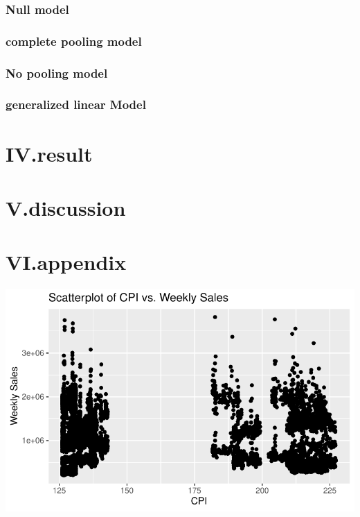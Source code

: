 \documentclass[
  letterpaper,
  DIV=11,
  numbers=noendperiod]{scrartcl}
\begin{document}
\hypertarget{null-model}{%
\subsubsection{Null model}\label{null-model}}

\hypertarget{complete-pooling-model}{%
\subsubsection{complete pooling model}\label{complete-pooling-model}}

\hypertarget{no-pooling-model}{%
\subsubsection{No pooling model}\label{no-pooling-model}}

\hypertarget{generalized-linear-model}{%
\subsubsection{generalized linear
Model}\label{generalized-linear-model}}

\hypertarget{iv.result}{%
\section{IV.result}\label{iv.result}}

\hypertarget{v.discussion}{%
\section{V.discussion}\label{v.discussion}}

\hypertarget{vi.appendix}{%
\section{VI.appendix}\label{vi.appendix}}

\includegraphics{678final_files/figure-pdf/unnamed-chunk-12-1.pdf}
\end{document}
